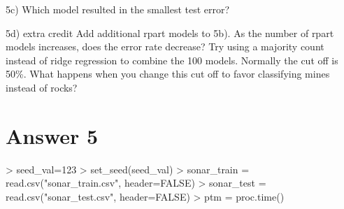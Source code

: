 \documentclass{article}
\begin{document}
5c) Which model resulted in the smallest test error?

5d) extra credit Add additional rpart models to 5b). As the number of rpart
models increases, does the error rate decrease? Try using a majority
count instead of ridge regression to combine the 100 models. Normally the
cut off is 50\%. What happens when you change this cut off to favor
classifying mines instead of rocks?

\section*{Answer  5}

\begin{Schunk}
\begin{Sinput}
> seed_val=123
> set_seed(seed_val)
> sonar_train = read.csv("sonar_train.csv", header=FALSE)
> sonar_test = read.csv("sonar_test.csv", header=FALSE)
> ptm = proc.time()
\end{Sinput}
\end{Schunk}
\end{document}
